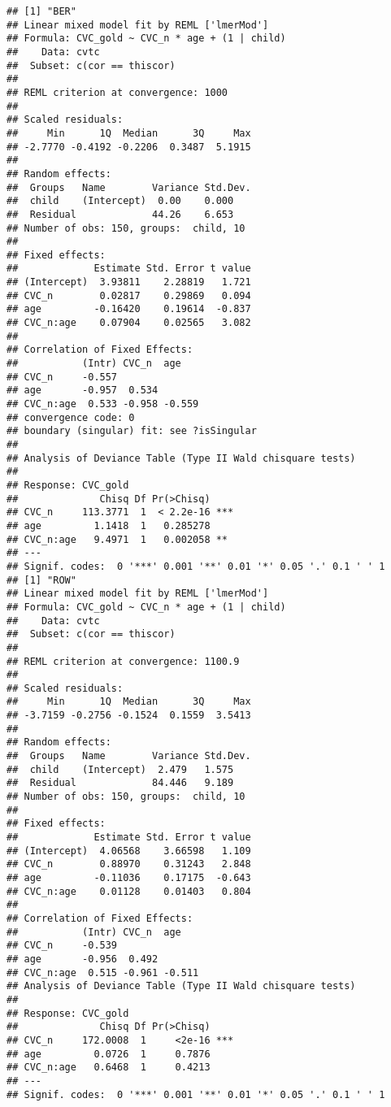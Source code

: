 \documentclass[english,floatsintext,man]{apa6}
\begin{document}
\begin{verbatim}
## [1] "BER"
## Linear mixed model fit by REML ['lmerMod']
## Formula: CVC_gold ~ CVC_n * age + (1 | child)
##    Data: cvtc
##  Subset: c(cor == thiscor)
## 
## REML criterion at convergence: 1000
## 
## Scaled residuals: 
##     Min      1Q  Median      3Q     Max 
## -2.7770 -0.4192 -0.2206  0.3487  5.1915 
## 
## Random effects:
##  Groups   Name        Variance Std.Dev.
##  child    (Intercept)  0.00    0.000   
##  Residual             44.26    6.653   
## Number of obs: 150, groups:  child, 10
## 
## Fixed effects:
##             Estimate Std. Error t value
## (Intercept)  3.93811    2.28819   1.721
## CVC_n        0.02817    0.29869   0.094
## age         -0.16420    0.19614  -0.837
## CVC_n:age    0.07904    0.02565   3.082
## 
## Correlation of Fixed Effects:
##           (Intr) CVC_n  age   
## CVC_n     -0.557              
## age       -0.957  0.534       
## CVC_n:age  0.533 -0.958 -0.559
## convergence code: 0
## boundary (singular) fit: see ?isSingular
## 
## Analysis of Deviance Table (Type II Wald chisquare tests)
## 
## Response: CVC_gold
##              Chisq Df Pr(>Chisq)    
## CVC_n     113.3771  1  < 2.2e-16 ***
## age         1.1418  1   0.285278    
## CVC_n:age   9.4971  1   0.002058 ** 
## ---
## Signif. codes:  0 '***' 0.001 '**' 0.01 '*' 0.05 '.' 0.1 ' ' 1
## [1] "ROW"
## Linear mixed model fit by REML ['lmerMod']
## Formula: CVC_gold ~ CVC_n * age + (1 | child)
##    Data: cvtc
##  Subset: c(cor == thiscor)
## 
## REML criterion at convergence: 1100.9
## 
## Scaled residuals: 
##     Min      1Q  Median      3Q     Max 
## -3.7159 -0.2756 -0.1524  0.1559  3.5413 
## 
## Random effects:
##  Groups   Name        Variance Std.Dev.
##  child    (Intercept)  2.479   1.575   
##  Residual             84.446   9.189   
## Number of obs: 150, groups:  child, 10
## 
## Fixed effects:
##             Estimate Std. Error t value
## (Intercept)  4.06568    3.66598   1.109
## CVC_n        0.88970    0.31243   2.848
## age         -0.11036    0.17175  -0.643
## CVC_n:age    0.01128    0.01403   0.804
## 
## Correlation of Fixed Effects:
##           (Intr) CVC_n  age   
## CVC_n     -0.539              
## age       -0.956  0.492       
## CVC_n:age  0.515 -0.961 -0.511
## Analysis of Deviance Table (Type II Wald chisquare tests)
## 
## Response: CVC_gold
##              Chisq Df Pr(>Chisq)    
## CVC_n     172.0008  1     <2e-16 ***
## age         0.0726  1     0.7876    
## CVC_n:age   0.6468  1     0.4213    
## ---
## Signif. codes:  0 '***' 0.001 '**' 0.01 '*' 0.05 '.' 0.1 ' ' 1

\end{verbatim}
\end{document}
